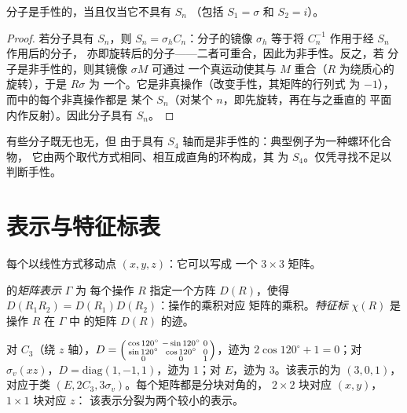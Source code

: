 \begin{theorem}[手性分子]\label{thm:b3:point-groups:chiral}
分子是手性的，当且仅当它不具有 $S_n$
（包括 $S_1 = \sigma$ 和 $S_2 = i$）。
\end{theorem}

\begin{proof}
若分子具有 $S_n$，则 $S_n = \sigma_hC_n$：分子的镜像 $\sigma_h$
等于将 $C_n^{-1}$ 作用于经 $S_n$ 作用后的分子，
亦即旋转后的分子——二者可重合，因此为非手性。反之，若
分子是非手性的，则其镜像 $\sigma M$ 可通过
一个真运动使其与 $M$ 重合（$R$ 为绕质心的旋转），于是 $R\sigma$ 为
一个。它是非真操作（改变手性，其矩阵的行列式
为 $-1$），而中的每个非真操作都是
某个 $S_n$（对某个 $n$，即先旋转，再在与之垂直的
平面内作反射）。因此分子具有 $S_n$。
\end{proof}

\begin{example}[无镜面的非手性分子]\label{ex:b3:point-groups:s4}
有些分子既无也无，但
由于具有 $S_4$ 轴而是非手性的：典型例子为一种螺环化合物，
它由两个取代方式相同、相互成直角的环构成，其
为 $S_4$。仅凭寻找不足以判断手性。
\end{example}

\section{表示与特征标表}

每个以线性方式移动点 $(x, y, z)$：它可以写成
一个 $3\times3$ 矩阵。

\begin{definition}\label{def:b3:point-groups:representation}
的\emph{矩阵表示} $\Gamma$ 为
每个操作 $R$ 指定一个方阵 $D(R)$，使得
$D(R_1R_2) = D(R_1)D(R_2)$：操作的乘积对应
矩阵的乘积。\emph{特征标} $\chi(R)$ 是操作 $R$ 在 $\Gamma$ 中
的矩阵 $D(R)$ 的迹。
\end{definition}

\begin{example}[$C_{3v}$ 的坐标]\label{ex:b3:point-groups:xyz}
对 $C_3$（绕 $z$ 轴），$D = \begin{psmallmatrix}\cos120^\circ & -\sin120^\circ &
0\\ \sin120^\circ & \cos120^\circ & 0\\ 0 & 0 & 1\end{psmallmatrix}$，迹为
$2\cos120^\circ + 1 = 0$；对 $\sigma_v(xz)$，$D = \mathrm{diag}(1, -1, 1)$，迹为
1；对 $E$，迹为 3。该表示的为 $(3, 0, 1)$，
对应于类 $(E, 2C_3, 3\sigma_v)$。每个矩阵都是分块对角的，
$2\times2$ 块对应 $(x, y)$，$1\times1$ 块对应 $z$：
该表示分裂为两个较小的表示。
\end{example}

